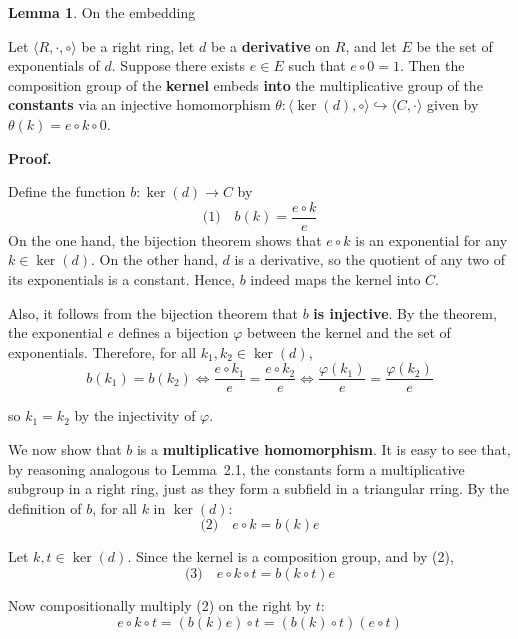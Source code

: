 \documentclass[12pt]{article}
\theoremstyle{definition}
\newtheorem{lemma}[definition]{Lemma}
\begin{document}
\newpage
\vspace{10pt}
\begin{lemma} On the embedding

\vspace{5pt}
Let \(\langle R, \cdot, \circ \rangle\) be a right ring, let \(d\) be a \textbf{derivative} on \(R\), 
and let \(E\) be the set of exponentials of \(d\). Suppose there exists \(e \in E\) such that \(e \circ 0 = 1\). 
Then the composition group of the \textbf{kernel} embeds \textbf{into} the multiplicative group 
of the \textbf{constants} via an injective homomorphism 
\(\theta: \langle \ker(d), \circ \rangle \hookrightarrow \langle C, \cdot \rangle\) 
given by \(\theta(k) = e \circ k \circ 0\).


\vspace{10pt}
\textbf{Proof.}

Define the function \(b: \ker(d) \to C\) by
\[
\text{(1)} \quad b(k) = \frac{e \circ k}{e} 
\]
On the one hand, the bijection theorem shows that \(e \circ k\) is an exponential for 
any \(k \in \ker(d)\). On the other hand, \(d\) is a derivative, so the quotient 
of any two of its exponentials is a constant. Hence, \(b\) indeed maps the kernel into \(C\).

\vspace{10pt}
Also, it follows from the bijection theorem that \(b\) \textbf{is injective}. 
By the theorem, the exponential \(e\) defines a bijection \(\varphi\) between the kernel and the set of exponentials. 
Therefore, for all \(k_1, k_2 \in \ker(d)\),
\[
b(k_1) = b(k_2) \iff \frac{e \circ k_1}{e} = \frac{e \circ k_2}{e} \iff \frac{\varphi(k_1)}{e} = \frac{\varphi(k_2)}{e}
\]

so \(k_1 = k_2\) by the injectivity of \(\varphi\).

\vspace{10pt}
We now show that \(b\) is a \textbf{multiplicative homomorphism}. It is easy to see that, 
by reasoning analogous to Lemma~2.1, the constants form a multiplicative subgroup in a right ring, 
just as they form a subfield in a triangular rring. By the definition of \(b\), for all $k$ in $\ker(d)$:
\[
\text{(2)} \quad e \circ k = b(k) e
\]

Let \(k, t \in \ker(d)\). Since the kernel is a composition group, and by (2),
\[
\text{(3)} \quad e \circ k \circ t = b(k \circ t) e
\]

\vspace{10pt}
Now compositionally multiply (2) on the right by \(t\):
\[
e \circ k \circ t = (b(k) e) \circ t = (b(k) \circ t)(e \circ t)
\]


\end{lemma}
\end{document}
